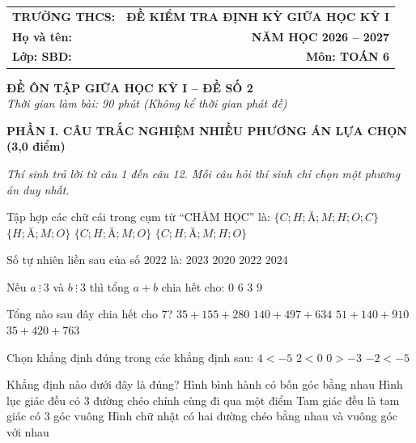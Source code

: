 \documentclass[12pt,a4paper]{article}
\begin{document}
\noindent
\begin{tabularx}{\linewidth}{X r}
\textbf{TRƯỜNG THCS: \dotfill} & \textbf{ĐỀ KIỂM TRA ĐỊNH KỲ GIỮA HỌC KỲ I} \\
\textbf{Họ và tên: \dotfill} & \textbf{NĂM HỌC 2026 -- 2027} \\
\textbf{Lớp: \dotfill \quad SBD: \dotfill} & \textbf{Môn: TOÁN 6} \\
\hline
\end{tabularx}
\vspace{2mm}

\begin{center}
  \textbf{\large ĐỀ ÔN TẬP GIỮA HỌC KỲ I -- ĐỀ SỐ 2}\\
  \textit{Thời gian làm bài: 90 phút (Không kể thời gian phát đề)}
\end{center}
\vspace{1mm}

\noindent\textbf{\large PHẦN I. CÂU TRẮC NGHIỆM NHIỀU PHƯƠNG ÁN LỰA CHỌN (3,0 điểm)}

\textit{Thí sinh trả lời từ câu 1 đến câu 12. Mỗi câu hỏi thí sinh chỉ chọn một phương án duy nhất.}

\vspace{1mm}
\begin{ex}
Tập hợp các chữ cái trong cụm từ “CHĂM HỌC” là:
\choice
{$\{C; H; Ă; M; H; O; C\}$}
{$\{H; Ă; M; O\}$}
{\True $\{C; H; Ă; M; O\}$}
{$\{C; H; Ă; M; H; O\}$}
\end{ex}

\begin{ex}
Số tự nhiên liền sau của số $2022$ là:
\choice
{\True $2023$}
{$2020$}
{$2022$}
{$2024$}
\end{ex}

\begin{ex}
Nếu $a \ \vdots \ 3$ và $b \ \vdots \ 3$ thì tổng $a + b$ chia hết cho:
\choice
{$0$}
{$6$}
{\True $3$}
{$9$}
\end{ex}

\begin{ex}
Tổng nào sau đây chia hết cho $7$?
\choice
{$35 + 155 + 280$}
{$140 + 497 + 634$}
{$51 + 140 + 910$}
{\True $35 + 420 + 763$}
\end{ex}

\begin{ex}
Chọn khẳng định đúng trong các khẳng định sau:
\choice
{$4 < -5$}
{$2 < 0$}
{\True $0 > -3$}
{$-2 < -5$}
\end{ex}

\begin{ex}
Khẳng định nào dưới đây là đúng?
\choice
{Hình bình hành có bốn góc bằng nhau}
{\True Hình lục giác đều có 3 đường chéo chính cùng đi qua một điểm}
{Tam giác đều là tam giác có 3 góc vuông}
{Hình chữ nhật có hai đường chéo bằng nhau và vuông góc với nhau}
\end{ex}
\end{document}
